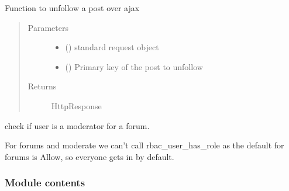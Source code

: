 \documentclass[letterpaper,10pt,english]{sphinxmanual}
\begin{document}
\begin{fulllineitems}
\label{\detokenize{forums:forums.views.unfollow_post_ajax}}
Function to unfollow a post over ajax
\begin{quote}\begin{description}
\item[{Parameters}] \leavevmode\begin{itemize}
\item {} 
 () \textendash{} standard request object

\item {} 
 () \textendash{} Primary key of the post to unfollow

\end{itemize}

\item[{Returns}] \leavevmode
HttpResponse

\end{description}\end{quote}

\end{fulllineitems}


\begin{fulllineitems}
\label{\detokenize{forums:forums.views.user_is_moderator_for_forum}}
check if user is a moderator for a forum.

For forums and moderate we can’t call rbac\_user\_has\_role as the default
for forums is Allow, so everyone gets in by default.

\end{fulllineitems}



\subsubsection{Module contents}
\label{\detokenize{forums:module-forums}}\label{\detokenize{forums:module-contents}}
\end{document}
